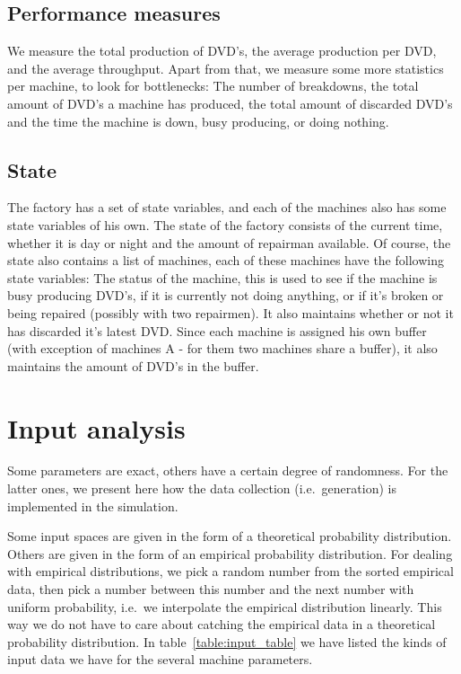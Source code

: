 \documentclass{article}
\begin{document}
\subsection{Performance measures}
\label{performance_measures}
We measure the total production of DVD's, the average production per DVD,
and the average throughput.
Apart from that, we measure some more statistics per machine, to look for bottlenecks:
The number of breakdowns, the total amount of DVD's a machine has produced,
the total amount of discarded DVD's and the time the machine is down,
busy producing, or doing nothing.

\subsection{State}
The factory has a set of state variables, and each of the machines also has some state variables of his own.
The state of the factory consists of the current time, whether it is day or night and the amount of repairman available.
Of course, the state also contains a list of machines, each of these machines have the following state variables:
The status of the machine, this is used to see if the machine is busy producing DVD's, if it is currently not doing anything, or if it's broken or being repaired (possibly with two repairmen).
It also maintains whether or not it has discarded it's latest DVD\@.
Since each machine is assigned his own buffer (with exception of machines A - for them two machines share a buffer), it also maintains the amount of DVD's in the buffer.


\section{Input analysis}
Some parameters are exact, others have a certain degree of randomness.
For the latter ones, we present here how the data collection (i.e.\ generation) is implemented in the simulation.

Some input spaces are given in the form of a theoretical probability distribution.
Others are given in the form of an empirical probability distribution.
For dealing with empirical distributions, we pick a random number from the sorted empirical data, then pick a number between this number and the next number with uniform probability, i.e.\ we interpolate the empirical distribution linearly.
This way we do not have to care about catching the empirical data in a theoretical probability distribution.
In table~\ref{table:input_table} we have listed the kinds of input data we have for the several machine parameters.
\end{document}
